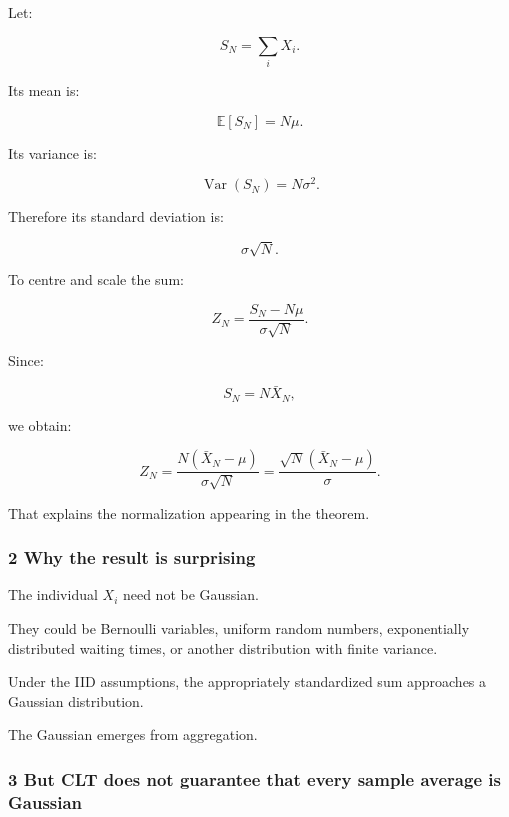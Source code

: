 \hypertarget{02-foundations-ii-ch030-deriving-the-normalization-scale}{}

Let:

\[
 S_N=\sum_iX_i.
\]

Its mean is:

\[
 \mathbb E[S_N]=N\mu.
\]

Its variance is:

\[
 \operatorname{Var}(S_N)=N\sigma^2.
\]

Therefore its standard deviation is:

\[
 \sigma\sqrt N.
\]

To centre and scale the sum:

\[
 Z_N= \frac{S_N-N\mu}{\sigma\sqrt N}.
\]

Since:

\[
 S_N=N\bar X_N,
\]

we obtain:

\[
 Z_N= \frac{N(\bar X_N-\mu)} {\sigma\sqrt N} = \frac{\sqrt N(\bar X_N-\mu)}{\sigma}.
\]

That explains the normalization appearing in the theorem.

\subsubsection{2 Why the result is surprising}\label{02-foundations-ii-ch030-why-the-result-is-surprising}

\hypertarget{02-foundations-ii-ch030-why-the-result-is-surprising}{}

The individual \(X_i\) need not be Gaussian.

They could be Bernoulli variables, uniform random numbers, exponentially distributed waiting times, or another distribution with finite variance.

Under the IID assumptions, the appropriately standardized sum approaches a Gaussian distribution.

The Gaussian emerges from aggregation.

\subsubsection{3 But CLT does not guarantee that every sample average is Gaussian}\label{02-foundations-ii-ch030-but-clt-does-not-guarantee-that-every-sample-average-is-gaussian}

\hypertarget{02-foundations-ii-ch030-but-clt-does-not-guarantee-that-every-sample-average-is-gaussian}{}

